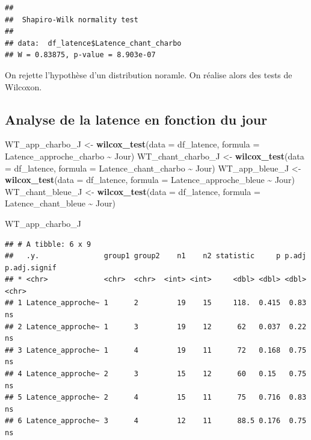 \documentclass[
  french,
]{article}
\newenvironment{Shaded}{\begin{snugshade}}{\end{snugshade}}
\newcommand{\AttributeTok}[1]{\textcolor[rgb]{0.13,0.29,0.53}{#1}}
\newcommand{\CommentTok}[1]{\textcolor[rgb]{0.56,0.35,0.01}{\textit{#1}}}
\newcommand{\FunctionTok}[1]{\textcolor[rgb]{0.13,0.29,0.53}{\textbf{#1}}}
\newcommand{\NormalTok}[1]{#1}
\newcommand{\OtherTok}[1]{\textcolor[rgb]{0.56,0.35,0.01}{#1}}
\newcommand{\SpecialCharTok}[1]{\textcolor[rgb]{0.81,0.36,0.00}{\textbf{#1}}}
\begin{document}
\begin{Shaded}
\end{Shaded}

\begin{verbatim}
## 
##  Shapiro-Wilk normality test
## 
## data:  df_latence$Latence_chant_charbo
## W = 0.83875, p-value = 8.903e-07
\end{verbatim}

On rejette l'hypothèse d'un distribution noramle. On réalise alors des
tests de Wilcoxon.

\subsection{Analyse de la latence en fonction du
jour}\label{analyse-de-la-latence-en-fonction-du-jour}

\begin{Shaded}
\begin{Highlighting}[]
\NormalTok{WT\_app\_charbo\_J }\OtherTok{\textless{}{-}} \FunctionTok{wilcox\_test}\NormalTok{(}\AttributeTok{data =}\NormalTok{ df\_latence, }\AttributeTok{formula =}\NormalTok{ Latence\_approche\_charbo }\SpecialCharTok{\textasciitilde{}}\NormalTok{ Jour)}
\NormalTok{WT\_chant\_charbo\_J }\OtherTok{\textless{}{-}} \FunctionTok{wilcox\_test}\NormalTok{(}\AttributeTok{data =}\NormalTok{ df\_latence, }\AttributeTok{formula =}\NormalTok{ Latence\_chant\_charbo }\SpecialCharTok{\textasciitilde{}}\NormalTok{ Jour)}
\NormalTok{WT\_app\_bleue\_J }\OtherTok{\textless{}{-}} \FunctionTok{wilcox\_test}\NormalTok{(}\AttributeTok{data =}\NormalTok{ df\_latence, }\AttributeTok{formula =}\NormalTok{ Latence\_approche\_bleue }\SpecialCharTok{\textasciitilde{}}\NormalTok{ Jour)}
\NormalTok{WT\_chant\_bleue\_J }\OtherTok{\textless{}{-}} \FunctionTok{wilcox\_test}\NormalTok{(}\AttributeTok{data =}\NormalTok{ df\_latence, }\AttributeTok{formula =}\NormalTok{ Latence\_chant\_bleue }\SpecialCharTok{\textasciitilde{}}\NormalTok{ Jour)}

\NormalTok{WT\_app\_charbo\_J}
\end{Highlighting}
\end{Shaded}

\begin{verbatim}
## # A tibble: 6 x 9
##   .y.               group1 group2    n1    n2 statistic     p p.adj p.adj.signif
## * <chr>             <chr>  <chr>  <int> <int>     <dbl> <dbl> <dbl> <chr>       
## 1 Latence_approche~ 1      2         19    15     118.  0.415  0.83 ns          
## 2 Latence_approche~ 1      3         19    12      62   0.037  0.22 ns          
## 3 Latence_approche~ 1      4         19    11      72   0.168  0.75 ns          
## 4 Latence_approche~ 2      3         15    12      60   0.15   0.75 ns          
## 5 Latence_approche~ 2      4         15    11      75   0.716  0.83 ns          
## 6 Latence_approche~ 3      4         12    11      88.5 0.176  0.75 ns
\end{verbatim}
\end{document}
